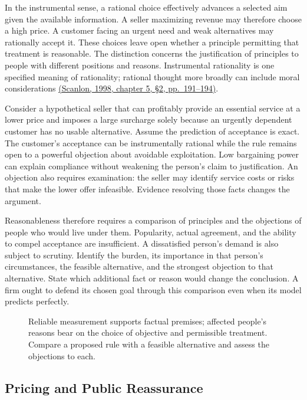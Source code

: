 \noindent \noindent In the instrumental sense, a rational choice effectively
advances a selected aim given the available information. A seller
maximizing revenue may therefore choose a high price. A customer facing
an urgent need and weak alternatives may rationally accept it. These
choices leave open whether a principle permitting that treatment is
reasonable. The distinction concerns the justification of principles to
people with different positions and reasons. Instrumental rationality is
one specified meaning of rationality; rational thought more broadly can
include moral considerations
\href{https://e-edu.nbu.bg/pluginfile.php/314831/mod_resource/content/0/scanlon_5.1-3.pdf}{(Scanlon,
1998, chapter 5, §2, pp.~191--194)}.

Consider a hypothetical seller that can profitably provide an essential
service at a lower price and imposes a large surcharge solely because an
urgently dependent customer has no usable alternative. Assume the
prediction of acceptance is exact. The customer's acceptance can be
instrumentally rational while the rule remains open to a powerful
objection about avoidable exploitation. Low bargaining power can explain
compliance without weakening the person's claim to justification. An
objection also requires examination: the seller may identify service
costs or risks that make the lower offer infeasible. Evidence resolving
those facts changes the argument.

Reasonableness therefore requires a comparison of principles and the
objections of people who would live under them. Popularity, actual
agreement, and the ability to compel acceptance are insufficient. A
dissatisfied person's demand is also subject to scrutiny. Identify the
burden, its importance in that person's circumstances, the feasible
alternative, and the strongest objection to that alternative. State
which additional fact or reason would change the conclusion. A firm
ought to defend its chosen goal through this comparison even when its
model predicts perfectly.

\begin{figure}[htbp]
\centering

\caption{Reliable measurement supports factual premises; affected people’s reasons bear on the choice of objective and permissible treatment. Compare a proposed rule with a feasible alternative and assess the objections to each.}\label{fig:M09_pricing_reasons}
\end{figure}

\hypertarget{M09-pricing-and-public-reassurance}{%
\subsection{Pricing and Public
Reassurance}\label{M09-pricing-and-public-reassurance}}

